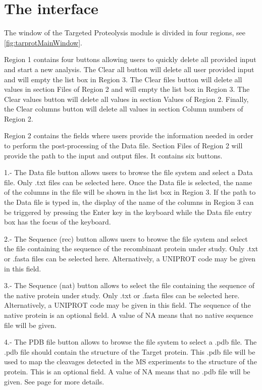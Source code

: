 \section{The interface}

The window of the Targeted Proteolysis module is divided in four regions, see \autoref{fig:tarprotMainWindow}. 

Region \num{1} contains four buttons allowing users to quickly delete all provided input and start a new analysis. The Clear all button will delete all user provided input and will empty the list box in Region \num{3}. The Clear files button will delete all values in section Files of Region \num{2} and will empty the list box in Region \num{3}. The Clear values button will delete all values in section Values of Region \num{2}. Finally, the Clear columns button will delete all values in section Column numbers of Region \num{2}. 

Region \num{2} contains the fields where users provide the information needed in order to perform the post-processing of the Data file. Section Files of Region \num{2} will provide the path to the input and output files. It contains six buttons. 

\num{1}.- The Data file button allows users to browse the file system and select a Data file. Only .txt files can be selected here. Once the Data file is selected, the name of the columns in the file will be shown in the list box in Region \num{3}. If the path to the Data file is typed in, the display of the name of the columns in Region \num{3} can be triggered by pressing the Enter key in the keyboard while the Data file entry box has the focus of the keyboard.

\num{2}.- The Sequence (rec) button allows users to browse the file system and select the file containing the sequence of the recombinant protein under study. Only .txt or .fasta files can be selected here. Alternatively,  a UNIPROT code may be given in this field.

\num{3}.- The Sequence (nat) button allows to select the file containing the sequence of the native protein under study. Only .txt or .fasta files can be selected here. Alternatively, a UNIPROT code may be given in this field. The sequence of the native protein is an optional field. A value of NA means that no native sequence file will be given. 

\num{4}.- The PDB file button allows to browse the file system to select a .pdb file. The .pdb file should contain the structure of the Target protein. This .pdb file will be used to map the cleavages detected in the MS experiments to the structure of the protein. This is an optional field. A value of NA means that no .pdb file will be given. See page \pageref{par:tarprotPdbID} for more details. 


